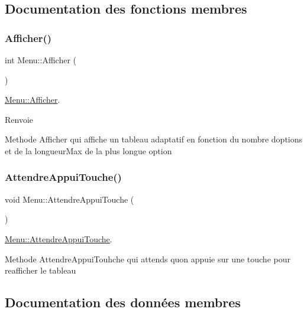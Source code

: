 \subsection{Documentation des fonctions membres}
\mbox{\label{class_menu_a079e0c6a24248a07993b48b310ba65ce}} 
\subsubsection{\texorpdfstring{Afficher()}{Afficher()}}
{\footnotesize\ttfamily int Menu\+::\+Afficher (\begin{DoxyParamCaption}{ }\end{DoxyParamCaption})}



\hyperlink{class_menu_a079e0c6a24248a07993b48b310ba65ce}{Menu\+::\+Afficher}. 

\begin{DoxyReturn}{Renvoie}

\end{DoxyReturn}
Methode Afficher qui affiche un tableau adaptatif en fonction du nombre d\textquotesingle{}options et de la longueur\+Max de la plus longue option \mbox{\label{class_menu_a6ddcaabf2fedb30f5136f3be655d60ce}} 
\subsubsection{\texorpdfstring{Attendre\+Appui\+Touche()}{AttendreAppuiTouche()}}
{\footnotesize\ttfamily void Menu\+::\+Attendre\+Appui\+Touche (\begin{DoxyParamCaption}{ }\end{DoxyParamCaption})\hspace{0.3cm}{\ttfamily [static]}}



\hyperlink{class_menu_a6ddcaabf2fedb30f5136f3be655d60ce}{Menu\+::\+Attendre\+Appui\+Touche}. 

Methode Attendre\+Appui\+Touhche qui attends qu\textquotesingle{}on appuie sur une touche pour reafficher le tableau 

\subsection{Documentation des données membres}
\mbox{\label{class_menu_a745c540589015b573d8214e1080e2a8e}} 
